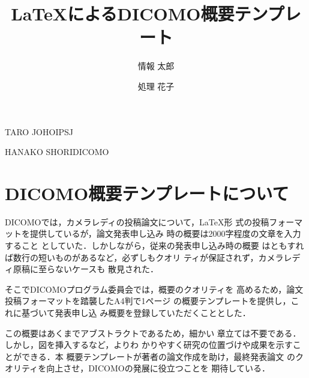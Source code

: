 \documentclass[Japanese]{dicomopapers}
\begin{document}
\title{{\LaTeX}によるDICOMO概要テンプレート}



\author{情報 太郎}{TARO JOHO}{IPSJ}
\author{処理 花子}{HANAKO SHORI}{DICOMO}

\maketitle

\section{DICOMO概要テンプレートについて}
DICOMOでは，カメラレディの投稿論文について，\LaTeX 形
式の投稿フォーマットを提供しているが，論文発表申し込み
時の概要は2000字程度の文章を入力すること
としていた．しかしながら，従来の発表申し込み時の概要
はともすれば数行の短いものがあるなど，必ずしもクオリ
ティが保証されず，カメラレディ原稿に至らないケースも
散見された．

そこでDICOMOプログラム委員会では，概要のクオリティを
高めるため，論文投稿フォーマットを踏襲したA4判で1ページ
の概要テンプレートを提供し，これに基づいて発表申し込
み概要を登録していただくこととした．

この概要はあくまでアブストラクトであるため，細かい
章立ては不要である．しかし，図を挿入するなど，よりわ
かりやすく研究の位置づけや成果を示すことができる．本
概要テンプレートが著者の論文作成を助け，最終発表論文
のクオリティを向上させ，DICOMOの発展に役立つことを
期待している．
\end{document}
